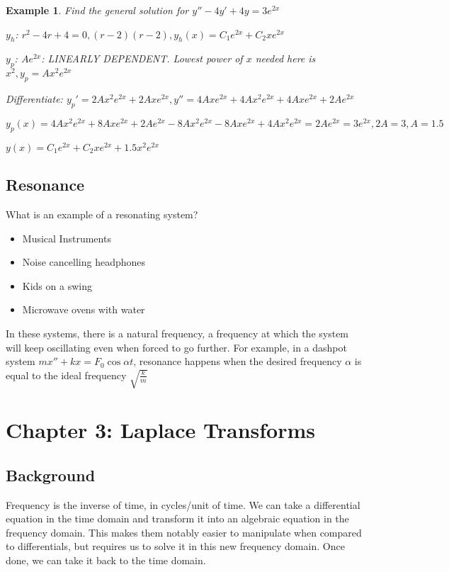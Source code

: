 \documentclass{article}
\newtheorem{example}{Example}
\begin{document}
\begin{example}
	Find the general solution for $y''-4y'+4y=3e^{2x}$

	$y_h$: $r^2-4r+4=0, (r-2)(r-2), y_h(x)=C_1e^{2x}+C_2xe^{2x}$
	
	$y_p$: $Ae^{2x}$: LINEARLY DEPENDENT. Lowest power of $x$ needed here is $x^2, y_p=Ax^2e^{2x}$

	Differentiate: $y_p'=2Ax^2e^{2x}+2Axe^{2x}, y''=4Axe^{2x}+4Ax^2e^{2x}+4Axe^{2x}+2Ae^{2x}$

	$y_p(x)=4Ax^2e^{2x}+8Axe^{2x}+2Ae^{2x}-8Ax^2e^{2x}-8Axe^{2x}+4Ax^2e^{2x}=2Ae^{2x}=3e^{2x}, 2A=3, A=1.5$

	$y(x)=C_1e^{2x}+C_2xe^{2x}+1.5x^2e^{2x}$
\end{example}

\subsection{Resonance}
What is an example of a resonating system?

\begin{itemize}
	\item Musical Instruments
	\item Noise cancelling headphones
	\item Kids on a swing
	\item Microwave ovens with water
\end{itemize}

In these systems, there is a natural frequency, a frequency at which the system will keep oscillating even when forced to go further.
For example, in a dashpot system $mx''+kx=F_0 \cos{\alpha t}$, resonance happens when the desired frequency $\alpha$ is equal to the ideal frequency $\sqrt{\frac{k}{m}}$

\section{Chapter 3: Laplace Transforms}
\subsection{Background}

Frequency is the inverse of time, in cycles/unit of time. We can take a differential equation in the time domain and transform it into an
algebraic equation in the frequency domain. This makes them notably easier to manipulate when compared to differentials, but
requires us to solve it in this new frequency domain. Once done, we can take it back to the time domain.
\end{document}
